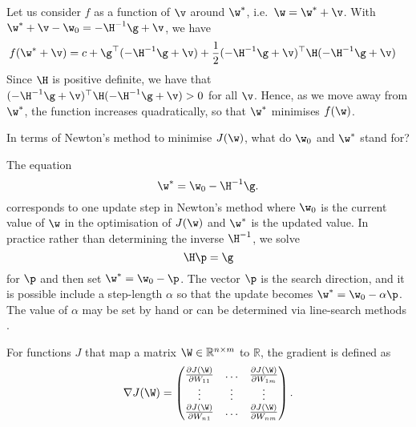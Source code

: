 \begin{exenumerate}
\begin{solution}
    Let us consider $f$ as a function of $\v$ around $\w^\ast$, i.e.\ $\w = \w^\ast+\v$. With $\w^\ast+\v-\w_0= -\H^{-1}\g + \v$, we have
    \begin{align}
      f(\w^\ast+\v) & = c + \g^\top(- \H^{-1} \g+\v) + \frac{1}{2}(-\H^{-1}\g + \v)^\top \H (-\H^{-1}\g + \v)
    \end{align}
    Since $\H$ is positive definite, we have that $(-\H^{-1}\g + \v)^\top \H
    (-\H^{-1}\g + \v)>0$ for all $\v$. Hence, as we move away from $\w^\ast$,
    the function increases quadratically, so that $\w^\ast$ minimises $f(\w)$.
    
  \end{solution}
  
  
\item In terms of Newton's method to minimise $J(\w)$, what do $\w_0$ and $\w^\ast$ stand for?
  
  \begin{solution}
    The equation
    \begin{equation}
      \w^\ast = \w_0 - \H^{-1} \g.
    \end{equation}
    corresponds to one update step in Newton's method where $\w_0$ is the
    current value of $\w$ in the optimisation of $J(\w)$ and $\w^\ast$ is the
    updated value. In practice rather than determining the inverse $\H^{-1}$, we solve
    \begin{equation}
      \H \p = \g
    \end{equation}
    for $\p$ and then set $\w^\ast = \w_0 - \p$. The vector $\p$ is the
    search direction, and it is possible include a step-length $\alpha$ so that
    the update becomes $\w^\ast = \w_0 - \alpha \p$. The value of $\alpha$ may
    be set by hand or can be determined via line-search methods \citep[see
    e.g.][]{Nocedal1999}.
\end{solution}
\end{exenumerate}


\label{ex:grad-matrix}
For functions $J$ that map a matrix $\W \in \mathbb{R}^{n\times m}$ to $\mathbb{R}$, the gradient is defined as 
\begin{equation}
  \nabla J(\W) = 
  \begin{pmatrix}
    \frac{\partial J(\W)}{\partial W_{11}} & \ldots &  \frac{\partial J(\W)}{\partial W_{1m}} \\
    \vdots & \vdots & \vdots\\
    \frac{\partial J(\W)}{\partial W_{n1}} & \ldots &  \frac{\partial J(\W)}{\partial W_{nm}}
  \end{pmatrix}.
\end{equation}

